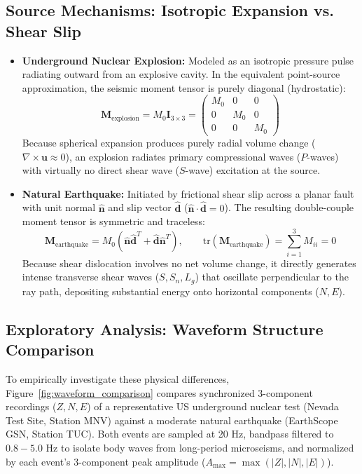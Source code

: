 \documentclass[11pt,a4paper]{article}
\begin{document}
\subsection{Source Mechanisms: Isotropic Expansion vs. Shear Slip}
\begin{itemize}
    \item \textbf{Underground Nuclear Explosion:} Modeled as an isotropic pressure pulse radiating outward from an explosive cavity. In the equivalent point-source approximation, the seismic moment tensor is purely diagonal (hydrostatic):
    \begin{equation*}
        \mathbf{M}_{\text{explosion}} = M_0 \mathbf{I}_{3\times3} = \begin{pmatrix} M_0 & 0 & 0 \\ 0 & M_0 & 0 \\ 0 & 0 & M_0 \end{pmatrix}
    \end{equation*}
    Because spherical expansion produces purely radial volume change ($\nabla \times \mathbf{u} \approx 0$), an explosion radiates primary compressional waves ($P$-waves) with virtually no direct shear wave ($S$-wave) excitation at the source.
    
    \item \textbf{Natural Earthquake:} Initiated by frictional shear slip across a planar fault with unit normal $\hat{\mathbf{n}}$ and slip vector $\hat{\mathbf{d}}$ ($\hat{\mathbf{n}} \cdot \hat{\mathbf{d}} = 0$). The resulting double-couple moment tensor is symmetric and traceless:
    \begin{equation*}
        \mathbf{M}_{\text{earthquake}} = M_0 (\hat{\mathbf{n}} \hat{\mathbf{d}}^T + \hat{\mathbf{d}} \hat{\mathbf{n}}^T), \qquad \text{tr}(\mathbf{M}_{\text{earthquake}}) = \sum_{i=1}^3 M_{ii} = 0
    \end{equation*}
    Because shear dislocation involves no net volume change, it directly generates intense transverse shear waves ($S, S_n, L_g$) that oscillate perpendicular to the ray path, depositing substantial energy onto horizontal components ($N, E$).
\end{itemize}

\subsection{Exploratory Analysis: Waveform Structure Comparison}
To empirically investigate these physical differences, Figure~\ref{fig:waveform_comparison} compares synchronized 3-component recordings ($Z, N, E$) of a representative US underground nuclear test (Nevada Test Site, Station MNV) against a moderate natural earthquake (EarthScope GSN, Station TUC). Both events are sampled at 20 Hz, bandpass filtered to $0.8 - 5.0\text{ Hz}$ to isolate body waves from long-period microseisms, and normalized by each event's 3-component peak amplitude ($A_{\text{max}} = \max(|Z|, |N|, |E|)$).
\end{document}
